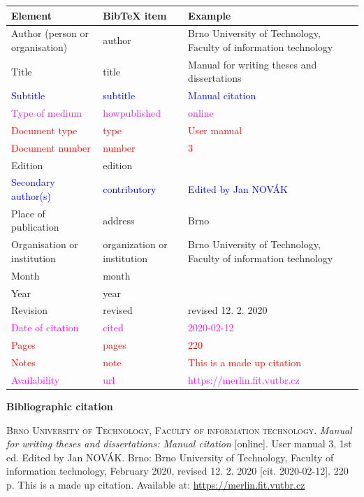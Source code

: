 \begin{tabularx}{0.95\linewidth}{>{\raggedright\arraybackslash}X X >{\raggedright\arraybackslash}X}
    Element & BibTeX item & Example\\\hline
    Author (person or organisation) & author & Brno University of Technology, Faculty of information technology\\
    Title & title & Manual for writing theses and dissertations\\
    \textcolor{blue}{Subtitle} & \textcolor{blue}{subtitle} & \textcolor{blue}{Manual citation}\\
    \textcolor{magenta}{Type of medium} & \textcolor{magenta}{howpublished} & \textcolor{magenta}{online}\\
    \textcolor{red}{Document type} & \textcolor{red}{type} & \textcolor{red}{User manual}\\
    \textcolor{red}{Document number} & \textcolor{red}{number} & \textcolor{red}{3}\\
    Edition & edition & 1\\
    \textcolor{blue}{Secondary author(s)} & \textcolor{blue}{contributory} & \textcolor{blue}{Edited by Jan NOVÁK}\\
    Place of publication & address & Brno\\
    Organisation or institution & organization or institution & Brno University of Technology, Faculty of information technology\\
    Month & month & 2\\
    Year & year & 2020\\
    Revision & revised & revised 12. 2. 2020\\
    \textcolor{magenta}{Date of citation} & \textcolor{magenta}{cited} & \textcolor{magenta}{2020-02-12}\\
    \textcolor{red}{Pages} & \textcolor{red}{pages} & \textcolor{red}{220}\\   
    \textcolor{red}{Notes} & \textcolor{red}{note} & \textcolor{red}{This is a made up citation}\\
    \textcolor{magenta}{Availability} & \textcolor{magenta}{url} & \textcolor{magenta}{https://merlin.fit.vutbr.cz}\\
\end{tabularx}

\bigskip

\noindent \textbf{Bibliographic citation}

\medskip

\noindent \textsc{Brno University of Technology, Faculty of information technology}. \textit{Manual for writing theses and dissertations: Manual citation} [online]. User manual 3, 1st ed. Edited by Jan NOVÁK.
Brno: Brno University of Technology, Faculty of information technology, February 2020, revised 12. 2. 2020 [cit. 2020-02-12]. 220 p. This is a made up citation. Available at: \url{https://merlin.fit.vutbr.cz}
\newpage

